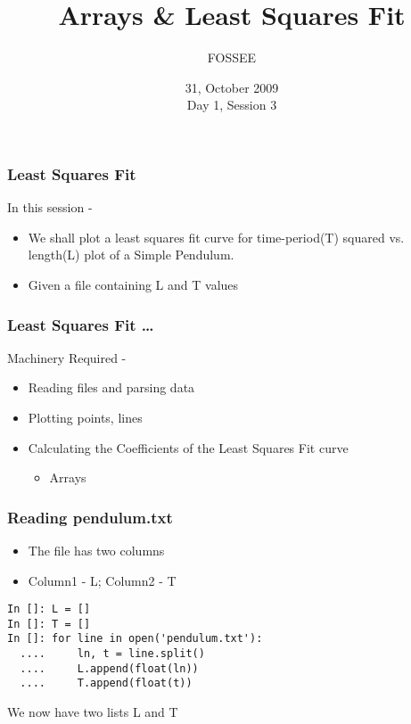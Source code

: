 \documentclass[14pt,compress]{beamer}
\title[]{Arrays \& Least Squares Fit}
\author[FOSSEE] {FOSSEE}
\institute[IIT Bombay] {Department of Aerospace Engineering\\IIT Bombay}
\date[] {31, October 2009\\Day 1, Session 3}
\newcounter{time}
\begin{document}
\begin{frame}
  \maketitle
\end{frame}


\begin{frame}
\frametitle{Least Squares Fit}
In this session - 
\begin{itemize}
\item We shall plot a least squares fit curve for time-period(T) squared vs. length(L) plot of a Simple Pendulum. 
\item Given a file containing L and T values
\end{itemize}
\end{frame}

\begin{frame}[fragile]
\frametitle{Least Squares Fit \ldots}
Machinery Required -
\begin{itemize}
\item Reading files and parsing data
\item Plotting points, lines
\item Calculating the Coefficients of the Least Squares Fit curve
\begin{itemize}
  \item Arrays
\end{itemize}
\end{itemize}
\end{frame}

\begin{frame}[fragile]
\frametitle{Reading pendulum.txt}
\begin{itemize}
  \item The file has two columns
  \item Column1 - L; Column2 - T
\end{itemize}
\begin{lstlisting}
In []: L = []
In []: T = []
In []: for line in open('pendulum.txt'):
  ....     ln, t = line.split()
  ....     L.append(float(ln))
  ....     T.append(float(t))
\end{lstlisting}
We now have two lists L and T
\end{frame}
\end{document}
